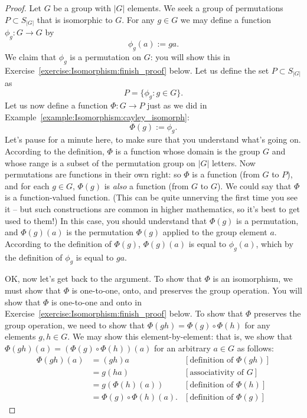 \begin{proof}
Let $G$ be a group with $|G|$ elements.  We seek a group of permutations $P \subset S_{|G|}$ that is isomorphic to $G$.  For any $g \in G$ we may  define a  function $\phi_g : G \rightarrow G$ by 
\[
\phi_g(a) := ga.
\]
  We claim that $\phi_g$ is a permutation on $G$: you will show this in Exercise~\ref{exercise:Isomorphism:finish_proof} below.  Let us define the set $P\subset S_{|G|}$ as
\[
P = \{ \phi_g : g \in G \}.
\]
Let us now define a function $\Phi: G \rightarrow P$ just as we did in Example~\ref{example:Isomorphism:cayley_isomorph}:
\[ \Phi(g) := \phi_g. \]
Let's pause for a minute here, to make sure that you understand what's going on. According to the definition, $\Phi$ is a function whose domain is the group $G$ and whose range is a subset of the permutation group on $|G|$ letters. Now permutations are functions in their own right: so  $\Phi$ is a function (from $G$ to $P$), and for each $g \in G$, $\Phi(g)$ is \emph{also} a function (from $G$ to $G$). We could say that $\Phi$ is a function-valued function. (This can be quite unnerving the first time you see it -- but such constructions are common in higher mathematics, so it's best to get used to them!) In this case, you should understand that $\Phi(g)$ is a permutation, and $\Phi(g) (a)$ is the permutation $\Phi(g)$ applied to the group element $a$. According to the definition of $\Phi(g)$,  $\Phi(g) (a)$ is equal to $\phi_g(a)$, which by the definition of $\phi_g$ is equal to $ga$.

OK, now let's get back to the argument. To show that $\Phi$ is an isomorphism, we must show that $\Phi$ is one-to-one, onto, and preserves the group operation. 
You will show that $\Phi$ is one-to-one and onto in Exercise~\ref{exercise:Isomorphism:finish_proof} below. To show that $\Phi$ preserves the group operation, we need to show that $\Phi(gh) = \Phi(g) \circ \Phi(h)$ for any elements $g, h \in G$. We may show this element-by-element: that is, we show that $\Phi(gh)(a) = (\Phi(g) \circ \Phi(h))(a)$ for an arbitrary $a \in G$ as follows:
\begin{align*}
 \Phi(gh)(a) &= (gh)a & [\text{definition of } \Phi(gh)]\\
&= g(ha) & [\text{associativity of }G]\\
 &= g(\Phi(h)(a)) & [\text{definition of } \Phi(h)]\\
 &=\Phi(g) \circ \Phi(h)(a). & [\text{definition of } \Phi(g)]
 \end{align*}
\end{proof}
\medskip

